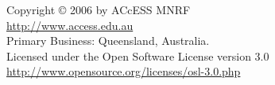 



\begin{center}
           Copyright © 2006 by ACcESS MNRF \\
               \url{http://www.access.edu.au} \\
         Primary Business: Queensland, Australia. \\
   Licensed under the Open Software License version 3.0 \\
      \url{http://www.opensource.org/licenses/osl-3.0.php} \\
\end{center}
